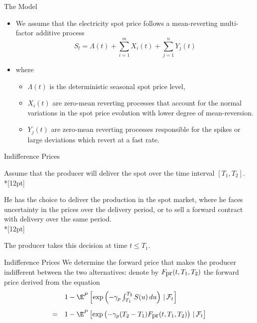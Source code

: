 {The Model}
\begin{itemize}
\item<1->
We assume that the electricity spot price follows a
mean-reverting multi-factor additive process
\begin{equation}\label{equation for additive stock price}
S_t=\Lambda(t)+\sum_{i=1}^mX_i(t)+\sum_{j=1}^nY_j(t)
\end{equation}
\item<2->
where
\begin{itemize}
\item $\Lambda(t)$ is the deterministic seasonal spot price level,
\item $X_i(t)$ are zero-mean reverting processes that account for the normal
variations in the spot price evolution with lower degree of
mean-reversion.
\item $Y_j(t)$ are
zero-mean reverting processes responsible for the spikes or large
deviations which revert at a fast rate.
\end{itemize}
\end{itemize}






{Indifference Prices}

Assume that the producer will deliver the spot over the time
interval $[T_1,T_2]$.\\*[12pt]

He has the choice to deliver the production in
the spot market, where he faces uncertainty in the prices over the
delivery period, or to sell a forward contract with delivery over
the same period.\\*[12pt]

The producer takes this decision at time $t\leq
T_1$.




{Indifference Prices}
We determine the forward price that makes the producer indifferent
between the two alternatives: denote by $F_{\hbox{pr}}(t,T_1,T_2)$
the forward price derived from the equation
$$
\begin{array}{ll}


& 1-\E^P\left[\exp\left(-\gamma_p\int_{T_1}^{T_2}S(u)\,du\right)\,|\,
\mathcal{F}_t\right]\\*[12pt]
= & 1-\E^P\left[\exp\left(-\gamma_p(T_2-T_1)F_{\hbox{pr}}(t,T_1,T_2)\right)\,|\,
\mathcal{F}_t\right]
\end{array}
$$


